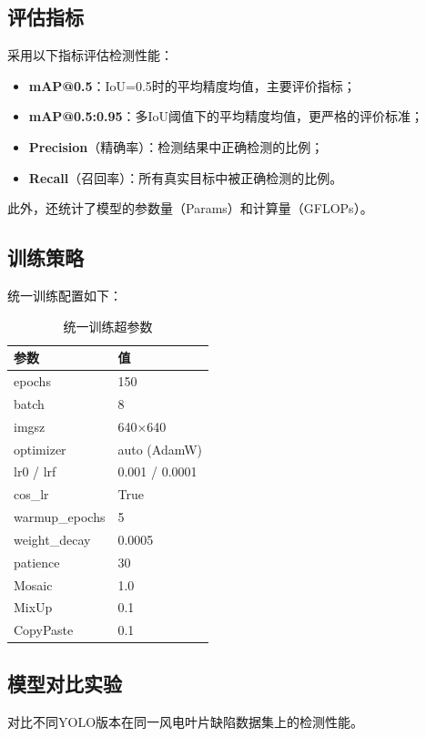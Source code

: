 \documentclass[12pt,a4paper]{article}
\begin{document}
\subsection{评估指标}

采用以下指标评估检测性能：
\begin{itemize}[noitemsep]
  \item \textbf{mAP@0.5}：IoU=0.5时的平均精度均值，主要评价指标；
  \item \textbf{mAP@0.5:0.95}：多IoU阈值下的平均精度均值，更严格的评价标准；
  \item \textbf{Precision}（精确率）：检测结果中正确检测的比例；
  \item \textbf{Recall}（召回率）：所有真实目标中被正确检测的比例。
\end{itemize}

此外，还统计了模型的参数量（Params）和计算量（GFLOPs）。

\subsection{训练策略}

统一训练配置如下：

\begin{table}[H]
\centering
\caption{统一训练超参数}
\begin{tabular}{ll}
\toprule
参数 & 值 \\
\midrule
epochs & 150 \\
batch & 8 \\
imgsz & 640$\times$640 \\
optimizer & auto (AdamW) \\
lr0 / lrf & 0.001 / 0.0001 \\
cos\_lr & True \\
warmup\_epochs & 5 \\
weight\_decay & 0.0005 \\
patience & 30 \\
Mosaic & 1.0 \\
MixUp & 0.1 \\
CopyPaste & 0.1 \\
\bottomrule
\end{tabular}
\end{table}

\subsection{模型对比实验}

对比不同YOLO版本在同一风电叶片缺陷数据集上的检测性能。
\end{document}
